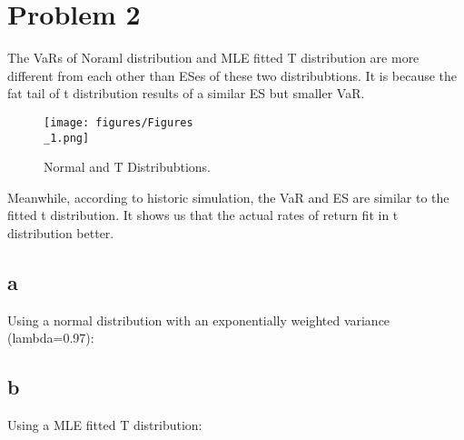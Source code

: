 \documentclass{gji}
\begin{document}
\section{Problem 2}
The VaRs of Noraml distribution and MLE fitted T distribution 
are more different from each other than ESes of these two 
distribubtions. It is because the fat tail of t distribution 
results of a similar ES but smaller VaR.

\begin{figure}
  \texttt{[image: figures/Figures\\\_1.png]}
  \caption{Normal and T Distribubtions.}
  \label{sample-figure}
\end{figure}

Meanwhile, according to historic simulation, the VaR and ES 
are similar to the fitted t distribution. It shows us that 
the actual rates of return fit in t distribution better.

\subsection{a}
Using a normal distribution with an exponentially weighted variance (lambda=0.97):



\subsection{b}
Using a MLE fitted T distribution: 


\end{document}
